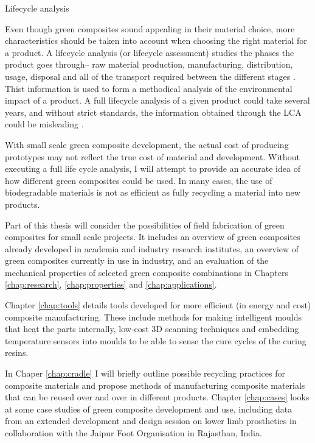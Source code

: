 \documentclass[]{report}
\begin{document}
{\sc Lifecycle analysis}

Even though green composites sound appealing in their material choice, more characteristics should be taken into account when choosing the right material for a product.  A lifecycle analysis (or lifecycle assessment) studies the phases the product goes through-- raw material production, manufacturing, distribution, usage, disposal and all of the transport required between the different stages \cite{lca}.  Thist information is used to form a methodical analysis of the environmental impact of a product.  A full lifecycle analysis of a given product could take several years, and without strict standards, the information obtained through the LCA could be misleading \cite{Jensen97}.

With small scale green composite development, the actual cost of producing prototypes may not reflect the true cost of material and development.  Without executing a full life cycle analysis, I will attempt to provide an accurate idea of how different green composites could be used.  In many cases, the use of biodegradable materials is not as efficient as fully recycling a material into new products.  

\vspace{20px}

Part of this thesis will consider the possibilities of field fabrication of green composites for small scale projects.  It includes an overview of green composites already developed in academia and industry research institutes, an overview of green composites currently in use in industry, and an evaluation of the mechanical properties of selected green composite combinations in Chapters \ref{chap:research}, \ref{chap:properties} and \ref{chap:applications}.

Chapter \ref{chap:tools} details tools developed for more efficient (in energy and cost) composite manufacturing.  These include methods for making intelligent moulds that heat the parts internally, low-cost 3D scanning techniques and embedding temperature sensors into moulds to be able to sense the cure cycles of the curing resins.

In Chaper \ref{chap:cradle} I will briefly outline possible recycling practices for composite materials and propose methods of manufacturing composite materials that can be reused over and over in different products.  Chapter \ref{chap:cases} looks at some case studies of green composite development and use, including data from an extended development and design session on lower limb prosthetics in collaboration with the  Jaipur Foot Organisation in Rajasthan, India.
\end{document}
